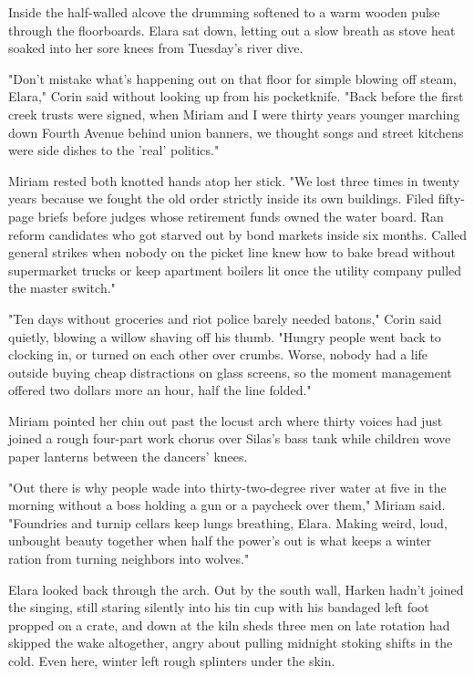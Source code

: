 Inside the half-walled alcove the drumming softened to a warm wooden pulse through the floorboards. Elara sat down, letting out a slow breath as stove heat soaked into her sore knees from Tuesday's river dive.

"Don't mistake what's happening out on that floor for simple blowing off steam, Elara," Corin said without looking up from his pocketknife. "Back before the first creek trusts were signed, when Miriam and I were thirty years younger marching down Fourth Avenue behind union banners, we thought songs and street kitchens were side dishes to the 'real' politics."

Miriam rested both knotted hands atop her stick. "We lost three times in twenty years because we fought the old order strictly inside its own buildings. Filed fifty-page briefs before judges whose retirement funds owned the water board. Ran reform candidates who got starved out by bond markets inside six months. Called general strikes when nobody on the picket line knew how to bake bread without supermarket trucks or keep apartment boilers lit once the utility company pulled the master switch."

"Ten days without groceries and riot police barely needed batons," Corin said quietly, blowing a willow shaving off his thumb. "Hungry people went back to clocking in, or turned on each other over crumbs. Worse, nobody had a life outside buying cheap distractions on glass screens, so the moment management offered two dollars more an hour, half the line folded."

Miriam pointed her chin out past the locust arch where thirty voices had just joined a rough four-part work chorus over Silas's bass tank while children wove paper lanterns between the dancers' knees.

"Out there is why people wade into thirty-two-degree river water at five in the morning without a boss holding a gun or a paycheck over them," Miriam said. "Foundries and turnip cellars keep lungs breathing, Elara. Making weird, loud, unbought beauty together when half the power's out is what keeps a winter ration from turning neighbors into wolves."

Elara looked back through the arch. Out by the south wall, Harken hadn't joined the singing, still staring silently into his tin cup with his bandaged left foot propped on a crate, and down at the kiln sheds three men on late rotation had skipped the wake altogether, angry about pulling midnight stoking shifts in the cold. Even here, winter left rough splinters under the skin.


